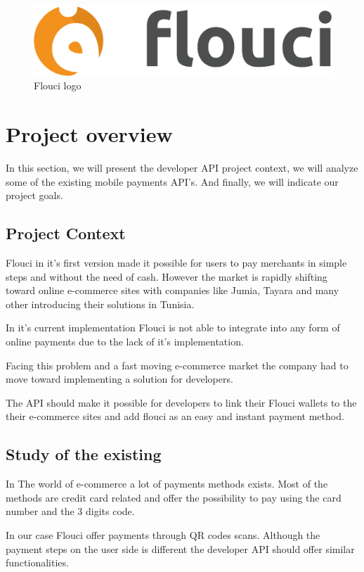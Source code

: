 \begin{spacing}{1.2}
\begin{figure}[!ht]\centering
\includegraphics[scale=0.3]{images/floucilogo.png}
\caption{Flouci logo}
\label{fig:fig1}
\end{figure}

\section{Project overview}
In this section, we will present the developer API project context, we will analyze some of the existing mobile payments API's. And finally, we will indicate our project goals.
\subsection{Project Context}
Flouci in it's first version made it possible for users to pay merchants in simple steps and without the need of cash. However the market is rapidly shifting toward online e-commerce sites with companies like Jumia, Tayara and many other introducing their solutions in Tunisia.

In it's current implementation Flouci is not able to integrate into any form of online payments due to the lack of it's implementation.

Facing this problem and a fast moving e-commerce market the company had to move toward implementing a solution for developers.

The API should make it possible for developers to link their Flouci wallets to the their e-commerce sites and add flouci as an easy and instant payment method.
\subsection{Study of the existing}
In The world of e-commerce a lot of payments methods exists. Most of the methods are credit card related and offer the possibility to pay using the card number and the 3 digits code. 

In our case Flouci offer payments through QR codes scans. Although the payment steps on the user side is different the developer API should offer similar functionalities.



\end{spacing}
